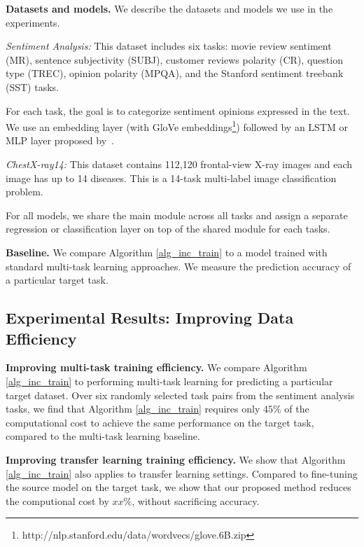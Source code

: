 {\bf Datasets and models.} We describe the datasets and models we use in the experiments.

{\it Sentiment Analysis:} This dataset includes six tasks: movie review sentiment (MR), sentence subjectivity (SUBJ), customer reviews polarity (CR), question type (TREC), opinion polarity (MPQA), and the Stanford sentiment treebank (SST) tasks.

{For each task, the goal is to categorize sentiment opinions expressed in the text.
We use an embedding layer (with GloVe embeddings\footnote{http://nlp.stanford.edu/data/wordvecs/glove.6B.zip}) followed by an LSTM or MLP layer proposed by~\cite{lei2018simple}.
}

{\it ChestX-ray14:} This dataset contains 112,120 frontal-view X-ray images and each image has up to 14 diseases.
This is a 14-task multi-label image classification problem.

For all models, we share the main module across all tasks and assign a separate regression or classification layer on top of the shared module for each tasks.

\textbf{Baseline.} We compare Algorithm \ref{alg_inc_train} to a model trained with standard multi-task learning approaches.
We measure the prediction accuracy of a particular target task.


\subsection{Experimental Results: Improving Data Efficiency}

\textbf{Improving multi-task training efficiency.}
We compare Algorithm \ref{alg_inc_train} to performing multi-task learning for predicting a particular target dataset.
Over six randomly selected task pairs from the sentiment analysis tasks, we find that Algorithm \ref{alg_inc_train} requires only $45\%$ of the computational cost to achieve the same performance on the target task, compared to the multi-task learning baseline.

\textbf{Improving transfer learning training efficiency.}
We show that Algorithm \ref{alg_inc_train} also applies to transfer learning settings.
Compared to fine-tuning the source model on the target task, we show that our proposed method reduces the computional cost by \alert{$xx\%$}, without sacrificing accuracy.

